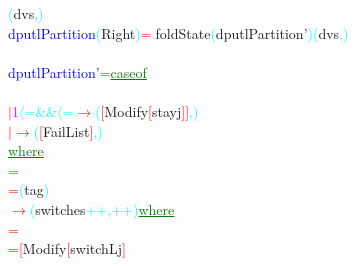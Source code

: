 {{\textcolor{cyan}{(}{\rm{}dvs}\textcolor{cyan}{,}\textcolor{cyan}{)}\\\textcolor{blue}{dputlPartition}\hsspace \textcolor{cyan}{(}{\rm{}Right}\textcolor{cyan}{)}\hsspace \textcolor{red}{=}\textcolor{cyan}{.}{\rm{}foldState}\hsspace \textcolor{cyan}{(}{\rm{}dputlPartition'}\textcolor{cyan}{)}\hsspace \textcolor{cyan}{(}{\rm{}dvs}\textcolor{cyan}{,}\textcolor{cyan}{)}\\\\\textcolor{blue}{dputlPartition'}\hsspace \textcolor{red}{=}\hsspace \textcolor{green}{\underline{case}}\hsspace \textcolor{green}{\underline{of}}\\\\\hstab \hstab \textcolor{red}{\ensuremath{|}}\hsspace \textcolor{magenta}{1}\hsspace \textcolor{cyan}{\ensuremath{\langle}=}\hsspace \textcolor{cyan}{\&\&}\hsspace \textcolor{cyan}{\ensuremath{\langle}=}\hsspace \textcolor{red}{\ensuremath{\rightarrow}}\hsspace \textcolor{cyan}{(}\textcolor{red}{[}{\rm{}Modify}\hsspace \textcolor{red}{[}{\rm{}stayj}\textcolor{red}{]}\textcolor{red}{]}\textcolor{cyan}{,}\textcolor{cyan}{)}\\\hstab \hstab \textcolor{red}{\ensuremath{|}}\hsspace \hsspace \hsspace \hsspace \hsspace \hsspace \hsspace \hsspace \textcolor{red}{\ensuremath{\rightarrow}}\hsspace \textcolor{cyan}{(}\textcolor{red}{[}{\rm{}FailList}\textcolor{red}{]}\textcolor{cyan}{,}\textcolor{cyan}{)}\\\hstab \hstab \textcolor{green}{\underline{where}}\\\hstab {}\hsspace \hsspace \textcolor{red}{=}\\\hstab {}\hsspace \textcolor{red}{=}\hsspace \textcolor{cyan}{(}{\rm{}tag}\textcolor{cyan}{)}\\\hsspace \textcolor{red}{\ensuremath{\rightarrow}}\hsspace \textcolor{cyan}{(}{\rm{}switches}\hsspace \textcolor{cyan}{++}\textcolor{cyan}{,}\hsspace \textcolor{cyan}{++}\textcolor{cyan}{)}\hsspace \textcolor{green}{\underline{where}}\\\hstab {}\hsspace \hsspace \hsspace \hsspace \hsspace \hsspace \hsspace \hsspace \textcolor{red}{=}\\\hstab {}\hsspace \textcolor{red}{=}\hsspace \textcolor{red}{[}{\rm{}Modify}\hsspace \textcolor{red}{[}{\rm{}switchLj}\textcolor{red}{]}\hsspace }}
